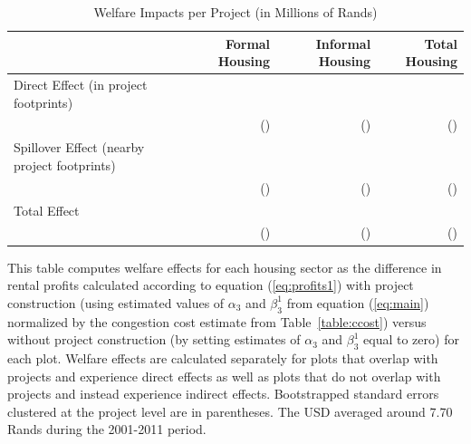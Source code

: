 \documentclass[12pt]{article}
\begin{document}
\begin{table}[h]
\centering
\caption{Welfare Impacts per Project (in Millions of Rands)}\label{table:welfare}
\vspace{-2mm}
\begin{threeparttable}
\begin{tabular}{lDDD}
\toprule
  &    Formal Housing  &  Informal Housing & Total Housing \\ \midrule 
Direct Effect (in project footprints) &   &  &  \\
 & (\unskip) & (\unskip) & (\unskip) \\[.5em]
Spillover Effect (nearby project footprints) &   &  &  \\
 & (\unskip) & (\unskip) & (\unskip) \\[.5em]
Total Effect &  &  &  \\
&  (\unskip) & (\unskip) & (\unskip) \\[.5em]
\bottomrule
\end{tabular}
\begin{tablenotes}
\item \footnotesize 
This table computes welfare effects for each housing sector as the difference in rental profits calculated according to equation (\ref{eq:profits1}) with project construction (using estimated values of $\alpha_3$ and $\beta_3^{1}$ from equation (\ref{eq:main}) normalized by the congestion cost estimate from Table~\ref{table:ccost}) versus without project construction (by setting estimates of $\alpha_3$ and $\beta_3^{1}$ equal to zero) for each plot.  Welfare effects are calculated separately for plots that overlap with projects and experience direct effects as well as plots that do not overlap with projects and instead experience indirect effects.  Bootstrapped standard errors clustered at the project level are in parentheses.  The USD averaged around 7.70 Rands during the 2001-2011 period.
\end{tablenotes}
\end{threeparttable}
\end{table}
\end{document}
